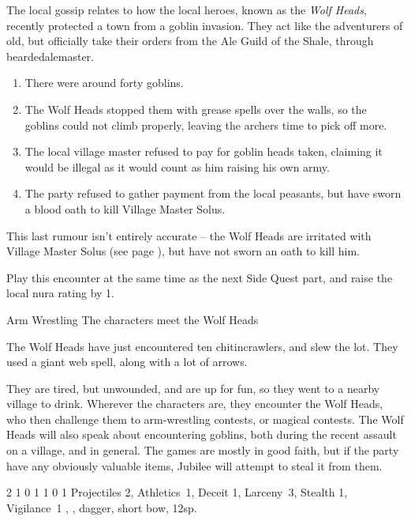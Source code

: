 \begin{multicols}{2}
The local gossip relates to how the local heroes, known as the \textit{Wolf Heads}, recently protected a town from a goblin invasion.
They act like the adventurers of old, but officially take their orders from the Ale Guild of the Shale, through \gls{beardedalemaster}.

\begin{enumerate}
  \item{There were around forty goblins.}
  \item{The Wolf Heads stopped them with grease spells over the walls, so the goblins could not climb properly, leaving the archers time to pick off more.}
  \item{The local village master refused to pay for goblin heads taken, claiming it would be illegal as it would count as him raising his own army.}
  \item{The party refused to gather payment from the local peasants, but have sworn a blood oath to kill Village Master Solus.}
\end{enumerate}

This last rumour isn't entirely accurate -- the Wolf Heads are irritated with Village Master Solus (see page \pageref{solus}), but have not sworn an oath to kill him.

Play this encounter at the same time as the next Side Quest part, and raise the local nura rating by 1.

{Arm Wrestling}%
{The characters meet the Wolf Heads}%
\label{wolfHeads}

The Wolf Heads have just encountered ten chitincrawlers, and slew the lot.
They used a giant web spell, along with a lot of arrows.

They are tired, but unwounded, and are up for fun, so they went to a nearby village to drink.
Wherever the characters are, they encounter the Wolf Heads, who then challenge them to arm-wrestling contests, or magical contests.
The Wolf Heads will also speak about encountering goblins, both during the recent assault on a village, and in general.
The games are mostly in good faith, but if the party have any obviously valuable items, Jubilee will attempt to steal it from them.

{2}%
{1}%
{{0}%
{1}%
{1}}%
{0}%
{1}%
{Projectiles 2, Athletics~1, Deceit 1, Larceny~3, Stealth 1, Vigilance~1\knacks{\snapshot, \laststand}}%
{\shortsword, \partialleather, dagger, short bow, 12sp.}%
{\addtocounter{fp}{5}}
\label{jubilee}


\end{multicols}
